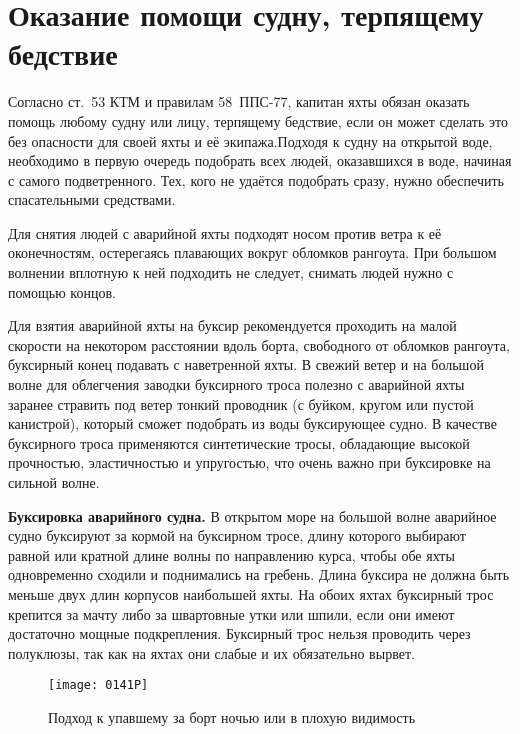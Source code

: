 \section{Оказание помощи судну, терпящему бедствие}

Согласно ст.~53 КТМ и правилам 58~ППС-77, капитан яхты обязан оказать помощь любому судну или лицу, терпящему бедствие, если он может сделать это без опасности для своей яхты и её экипажа.Подходя к судну на открытой воде, необходимо в первую очередь подобрать всех людей, оказавшихся в воде, начиная с самого подветренного. Тех, кого не удаётся подобрать сразу, нужно обеспечить спасательными средствами.

Для снятия людей с аварийной яхты подходят носом против ветра к её оконечностям, остерегаясь плавающих вокруг обломков рангоута. При большом волнении вплотную к ней подходить не следует, снимать людей нужно с помощью концов.

Для взятия аварийной яхты на буксир рекомендуется проходить на малой скорости на некотором расстоянии вдоль борта, свободного от обломков рангоута, буксирный конец подавать с наветренной яхты. В свежий ветер и на большой волне для облегчения заводки буксирного троса полезно с аварийной яхты заранее стравить под ветер тонкий проводник (с буйком, кругом или пустой канистрой), который сможет подобрать из воды буксирующее судно. В качестве буксирного троса применяются синтетические тросы, обладающие высокой прочностью, эластичностью и упругостью, что очень важно при буксировке на сильной волне. 

\textbf{Буксировка аварийного судна.} В открытом море на большой волне аварийное судно буксируют за кормой на буксирном тросе, длину которого выбирают равной или кратной длине волны по направлению курса, чтобы обе яхты одновременно сходили и поднимались на гребень. Длина буксира не должна быть меньше двух длин корпусов наибольшей яхты. На обоих яхтах буксирный трос крепится за мачту либо за швартовные утки или шпили, если они имеют достаточно мощные подкрепления. Буксирный трос нельзя проводить через полуклюзы, так как на яхтах они слабые и их обязательно вырвет. 

\begin{figure}[htb]
  \centering{}
  \texttt{[image: 0141P]}
  \caption{Подход к упавшему за борт ночью или в плохую видимость}
  \label{fig:141}
\end{figure}

